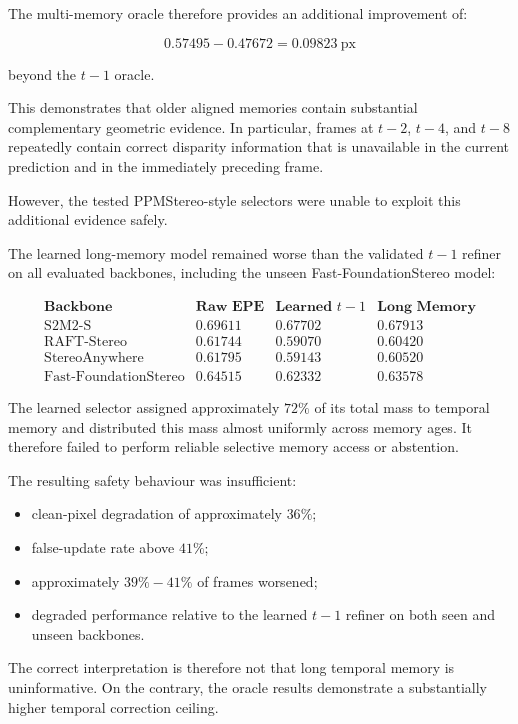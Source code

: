 \documentclass[11pt,a4paper]{article}
\begin{document}
The multi-memory oracle therefore provides an additional improvement of:

\[
0.57495 - 0.47672 = 0.09823 \ \mathrm{px}
\]

beyond the \(t-1\) oracle.

This demonstrates that older aligned memories contain substantial complementary geometric evidence. In particular, frames at \(t-2\), \(t-4\), and \(t-8\) repeatedly contain correct disparity information that is unavailable in the current prediction and in the immediately preceding frame.

However, the tested PPMStereo-style selectors were unable to exploit this additional evidence safely.

The learned long-memory model remained worse than the validated \(t-1\) refiner on all evaluated backbones, including the unseen Fast-FoundationStereo model:

\[
\begin{array}{l|ccc}
\textbf{Backbone} &
\textbf{Raw EPE} &
\textbf{Learned } t-1 &
\textbf{Long Memory} \\
\hline
\text{S2M2-S} & 0.69611 & 0.67702 & 0.67913 \\
\text{RAFT-Stereo} & 0.61744 & 0.59070 & 0.60420 \\
\text{StereoAnywhere} & 0.61795 & 0.59143 & 0.60520 \\
\text{Fast-FoundationStereo} & 0.64515 & 0.62332 & 0.63578
\end{array}
\]

The learned selector assigned approximately \(72\%\) of its total mass to temporal memory and distributed this mass almost uniformly across memory ages. It therefore failed to perform reliable selective memory access or abstention.

The resulting safety behaviour was insufficient:

\begin{itemize}
    \item clean-pixel degradation of approximately \(36\%\);
    \item false-update rate above \(41\%\);
    \item approximately \(39\%-41\%\) of frames worsened;
    \item degraded performance relative to the learned \(t-1\) refiner on both seen and unseen backbones.
\end{itemize}

The correct interpretation is therefore not that long temporal memory is uninformative. On the contrary, the oracle results demonstrate a substantially higher temporal correction ceiling.
\end{document}
